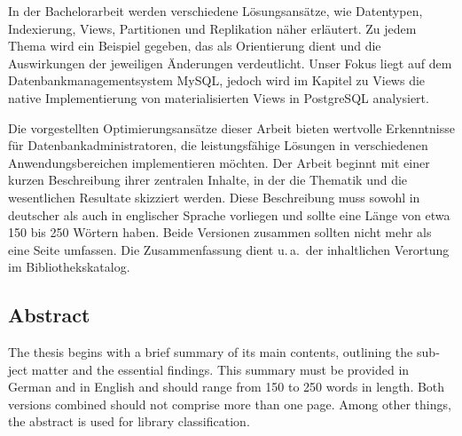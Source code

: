 In der Bachelorarbeit werden verschiedene Lösungsansätze, wie Datentypen, Indexierung, Views, Partitionen und Replikation näher erläutert.
Zu jedem Thema wird ein Beispiel gegeben, das als Orientierung dient und die Auswirkungen der jeweiligen Änderungen verdeutlicht.
Unser Fokus liegt auf dem Datenbankmanagementsystem MySQL, jedoch wird im Kapitel zu Views die native Implementierung von materialisierten Views in PostgreSQL analysiert.

Die vorgestellten Optimierungsansätze dieser Arbeit bieten wertvolle Erkenntnisse für Datenbankadministratoren, die leistungsfähige Lösungen in verschiedenen Anwendungsbereichen implementieren möchten.
\newline
\newline
\newline
Der Arbeit beginnt mit einer kurzen Beschreibung ihrer zentralen Inhalte, in der die Thematik und die wesentlichen Resultate skizziert werden.
Diese Beschreibung muss sowohl in deutscher als auch in englischer Sprache vorliegen und sollte eine Länge von etwa 150 bis 250 Wörtern haben.
Beide Versionen zusammen sollten nicht mehr als eine Seite umfassen.
Die Zusammenfassung dient u.\,a.\ der inhaltlichen Verortung im Bibliothekskatalog.

{
  \begin{otherlanguage}{english}
    \section*{Abstract}

    The thesis begins with a brief summary of its main contents, outlining the subject matter and the essential findings.
    This summary must be provided in German and in English and should range from 150 to 250 words in length.
    Both versions combined should not comprise more than one page.
    Among other things, the abstract is used for library classification.
  \end{otherlanguage}
}
